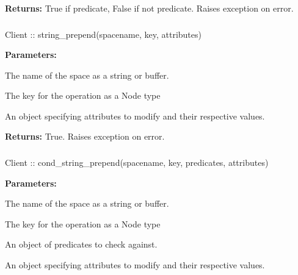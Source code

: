 \noindent\textbf{Returns:}
True if predicate, False if not predicate.  Raises exception on error.

\subsubsection{}
\label{api:nodejs:string_prepend}
\begin{javascriptcode}
Client :: string_prepend(spacename, key, attributes)
\end{javascriptcode}


\noindent\textbf{Parameters:}
\begin{description}[labelindent=\widthof{{\code{attributes}}},leftmargin=*,noitemsep,nolistsep,align=right]
\item[\code{spacename}] The name of the space as a string or buffer.
\item[\code{key}] The key for the operation as a Node type
\item[\code{attributes}] An object specifying attributes to modify and their respective values.
\end{description}

\noindent\textbf{Returns:}
True.  Raises exception on error.

\subsubsection{}
\label{api:nodejs:cond_string_prepend}
\begin{javascriptcode}
Client :: cond_string_prepend(spacename, key, predicates, attributes)
\end{javascriptcode}


\noindent\textbf{Parameters:}
\begin{description}[labelindent=\widthof{{\code{predicates}}},leftmargin=*,noitemsep,nolistsep,align=right]
\item[\code{spacename}] The name of the space as a string or buffer.
\item[\code{key}] The key for the operation as a Node type
\item[\code{predicates}] An object of predicates to check against.
\item[\code{attributes}] An object specifying attributes to modify and their respective values.
\end{description}


